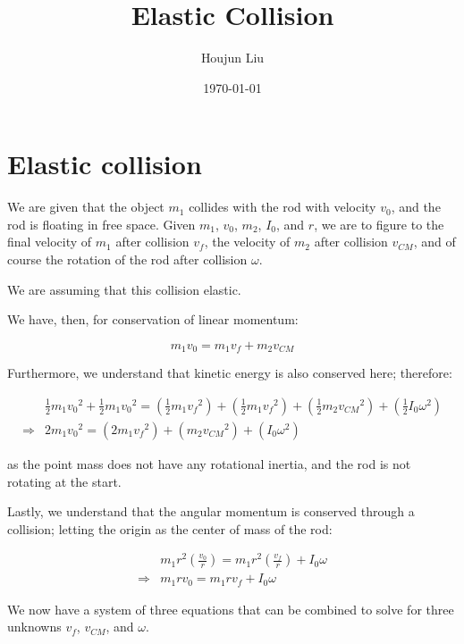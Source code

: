 \documentclass[letterpaper]{article}
\author{Houjun Liu}
\date{\today}
\title{Elastic Collision}
\renewcommand{\tableofcontents}{}
\renewcommand\maketitle{}
\begin{document}
\maketitle
\tableofcontents


\section{Elastic collision}
\label{sec:orge7811dd}
We are given that the object \(m_1\) collides with the rod with velocity \(v_0\), and the rod is floating in free space. Given \(m_1\), \(v_0\), \(m_2\), \(I_0\), and \(r\), we are to figure to the final velocity of \(m_1\) after collision \(v_f\), the velocity of \(m_2\) after collision \(v_{CM}\), and of course the rotation of the rod after collision \(\omega\).

We are assuming that this collision elastic.

We have, then, for conservation of linear momentum:

\begin{equation}
 m_1 v_0 = m_1v_f + m_2 v_{CM} 
\end{equation}

Furthermore, we understand that kinetic energy is also conserved here; therefore:

\begin{align}
&\frac{1}{2} m_1{v_0}^2 + \frac{1}{2} m_1 {v_0}^2 = \left(\frac{1}{2} m_1{v_f}^2\right)+\left(\frac{1}{2} m_1{v_f}^2\right)+\left(\frac{1}{2} m_2{v_{CM}}^2\right)+\left(\frac{1}{2} I_0{\omega}^2\right)\\
\Rightarrow & 2m_1{v_0}^2 = \left( 2m_1{v_f}^2\right)+\left( m_2{v_{CM}}^2\right)+\left( I_0{\omega}^2\right)
\end{align}

as the point mass does not have any rotational inertia, and the rod is not rotating at the start.

Lastly, we understand that the angular momentum is conserved through a collision; letting the origin as the center of mass of the rod:

\begin{align}
   &m_1 r^2 \left(\frac{v_0}{r}\right) = m_1 r^2 \left(\frac{v_f}{r}\right) + I_0 \omega\\
\Rightarrow &m_1 r v_0 = m_1 r v_f + I_0 \omega
\end{align}

We now have a system of three equations that can be combined to solve for three unknowns \(v_f\), \(v_{CM}\), and \(\omega\).
\end{document}
